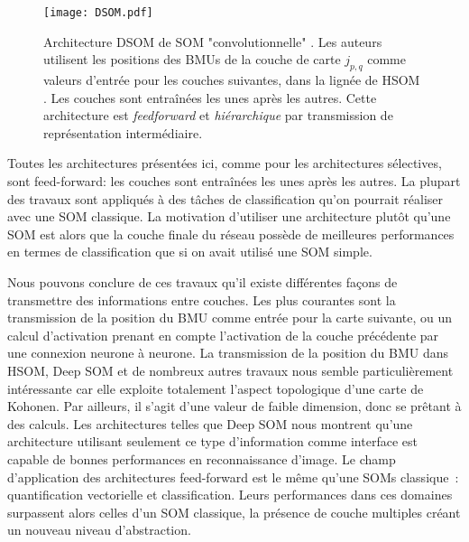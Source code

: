 \documentclass[../main]{subfiles}
\begin{document}
\begin{figure}
    \texttt{[image: DSOM.pdf]}
    \caption{Architecture DSOM de SOM "convolutionnelle" \cite{liu_deep_2015}. Les auteurs utilisent les positions des BMUs de la couche de carte $j_{p,q}$ comme valeurs d'entrée pour les couches suivantes, dans la lignée de HSOM \cite{lampinen_clustering_1992}. Les couches sont entraînées les unes après les autres. Cette architecture est \emph{feedforward} et \emph{hiérarchique} par transmission de représentation intermédiaire. \label{fig:dsom}}
\end{figure}

Toutes les architectures présentées ici, comme pour les architectures sélectives, sont feed-forward: les couches sont entraînées les unes après les autres. 
La plupart des travaux sont appliqués à des tâches de classification qu'on pourrait réaliser avec une SOM classique.
La motivation d'utiliser une architecture plutôt qu'une SOM est alors que la couche finale du réseau possède de meilleures performances en termes de classification que si on avait utilisé une SOM simple.


Nous pouvons conclure de ces travaux qu'il existe différentes façons de transmettre des informations entre couches. Les plus courantes sont la transmission de la position du BMU comme entrée pour la carte suivante, ou un calcul d'activation prenant en compte l'activation de la couche précédente par une connexion neurone à neurone.
La transmission de la position du BMU dans HSOM, Deep SOM et de nombreux autres travaux nous semble particulièrement intéressante car elle exploite totalement l'aspect topologique d'une carte de Kohonen. Par ailleurs, il s'agit d'une valeur de faible dimension, donc se prêtant à des calculs. Les architectures telles que Deep SOM nous montrent qu'une architecture utilisant seulement ce type d'information comme interface est capable de bonnes performances en reconnaissance d'image.
Le champ d'application des architectures feed-forward est le même qu'une SOMs classique~: quantification vectorielle et classification. Leurs performances dans ces domaines surpassent alors celles d'un SOM classique, la présence de couche multiples créant un nouveau niveau d'abstraction.
\end{document}
